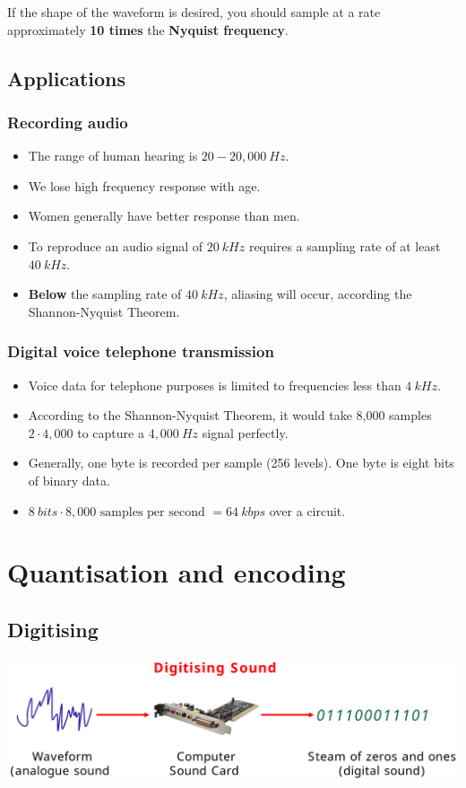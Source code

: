 \documentclass[11pt]{article}
\begin{document}
If the shape of the waveform is desired, you should sample at a rate approximately \textbf{10 times} the \textbf{Nyquist frequency}.
\subsection{Applications}
\label{sec:org95bb8c8}

\subsubsection{Recording audio}
\label{sec:orgd25bdcf}
\begin{itemize}
\item The range of human hearing is \(20 - 20,000 \ \unit{Hz}\).
\item We lose high frequency response with age.
\item Women generally have better response than men.
\item To reproduce an audio signal of \(\qty{20}{kHz}\) requires a sampling rate of at least \(\qty{40}{kHz}\).
\item \textbf{Below} the sampling rate of \(\qty{40}{kHz}\), aliasing will occur, according the Shannon-Nyquist Theorem.
\end{itemize}
\subsubsection{Digital voice telephone transmission}
\label{sec:org263b7ce}
\begin{itemize}
\item Voice data for telephone purposes is limited to frequencies less than \(\qty{4}{kHz}\).
\item According to the Shannon-Nyquist Theorem, it would take 8,000 samples \(2 \cdot 4,000\) to capture a \(4,000 \ \unit{Hz}\) signal perfectly.
\item Generally, one byte is recorded per sample (256 levels). One byte is eight bits of binary data.
\item \(\qty{8}{bits} \cdot 8,000 \text{ samples per second } = \qty{64}{kbps}\) over a circuit.
\end{itemize}

 \newpage
\section{Quantisation and encoding}
\label{sec:org01f6972}

\subsection{Digitising}
\label{sec:orgd2aa66f}
\begin{center}
\includegraphics[width=.9\linewidth]{./images/digitising-sound.png}
\end{center}
\end{document}

